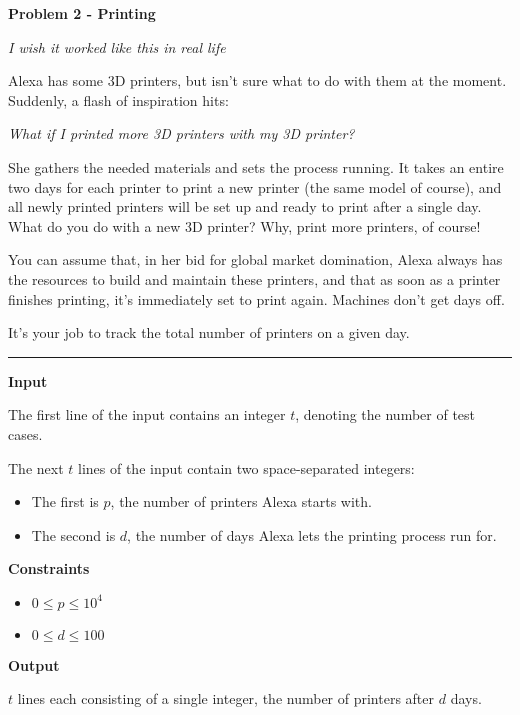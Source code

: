 \LARGE \textbf{Problem 2 - Printing} \normalsize

{\itshape I wish it worked like this in real life}

Alexa has some 3D printers, but isn't sure what to do with them at the moment.
Suddenly, a flash of inspiration hits:

\begin{center}
    \textit{What if I printed more 3D printers with my 3D printer?}
\end{center}

She gathers the needed materials and sets the process running. 
It takes an entire two days for each printer to print a new printer (the same model of course), 
and all newly printed printers will be set up and ready to print after a single day.
What do you do with a new 3D printer? Why, print more printers, of course!

You can assume that, in her bid for global market domination, 
Alexa always has the resources to build and maintain these printers, 
and that as soon as a printer finishes printing, it's immediately set to print again. 
Machines don't get days off.

It's your job to track the total number of printers on a given day.

\vspace{8pt}
\hrule

\textbf{Input}

The first line of the input contains an integer $t$, denoting the number of test cases.

The next $t$ lines of the input contain two space-separated integers:
\begin{itemize}
    \item The first is $p$, the number of printers Alexa starts with.
    \item The second is $d$, the number of days Alexa lets the printing process run for.
\end{itemize}

\textbf{Constraints}

\begin{itemize}
    \item $0 \leq p \leq 10^4$
    \item $0 \leq d \leq 100$
\end{itemize}

\textbf{Output}

$t$ lines each consisting of a single integer, the number of printers after $d$ days.

